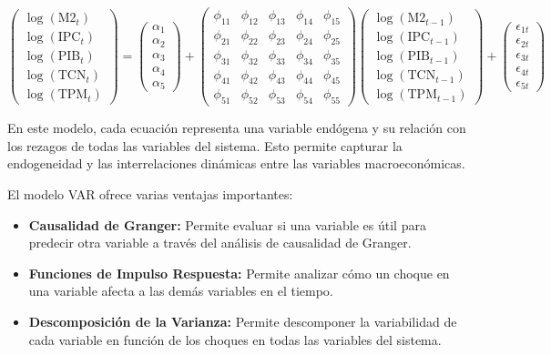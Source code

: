 \documentclass[
  12pt,
]{article}
\providecommand{\tightlist}{%
  \setlength{\itemsep}{0pt}\setlength{\parskip}{0pt}}
\begin{document}
\[
\begin{pmatrix}
\log(\text{M2}_t) \\
\log(\text{IPC}_t) \\
\log(\text{PIB}_t) \\
\log(\text{TCN}_t) \\
\log(\text{TPM}_t)
\end{pmatrix}
=
\begin{pmatrix}
\alpha_{1} \\
\alpha_{2} \\
\alpha_{3} \\
\alpha_{4} \\
\alpha_{5}
\end{pmatrix}
+
\begin{pmatrix}
\phi_{11} & \phi_{12} & \phi_{13} & \phi_{14} & \phi_{15} \\
\phi_{21} & \phi_{22} & \phi_{23} & \phi_{24} & \phi_{25} \\
\phi_{31} & \phi_{32} & \phi_{33} & \phi_{34} & \phi_{35} \\
\phi_{41} & \phi_{42} & \phi_{43} & \phi_{44} & \phi_{45} \\
\phi_{51} & \phi_{52} & \phi_{53} & \phi_{54} & \phi_{55}
\end{pmatrix}
\begin{pmatrix}
\log(\text{M2}_{t-1}) \\
\log(\text{IPC}_{t-1}) \\
\log(\text{PIB}_{t-1}) \\
\log(\text{TCN}_{t-1}) \\
\log(\text{TPM}_{t-1})
\end{pmatrix}
+
\begin{pmatrix}
\epsilon_{1t} \\
\epsilon_{2t} \\
\epsilon_{3t} \\
\epsilon_{4t} \\
\epsilon_{5t}
\end{pmatrix}
\]

En este modelo, cada ecuación representa una variable endógena y su
relación con los rezagos de todas las variables del sistema. Esto
permite capturar la endogeneidad y las interrelaciones dinámicas entre
las variables macroeconómicas.

El modelo VAR ofrece varias ventajas importantes:

\begin{itemize}
\tightlist
\item
  \textbf{Causalidad de Granger:} Permite evaluar si una variable es
  útil para predecir otra variable a través del análisis de causalidad
  de Granger.
\item
  \textbf{Funciones de Impulso Respuesta:} Permite analizar cómo un
  choque en una variable afecta a las demás variables en el tiempo.
\item
  \textbf{Descomposición de la Varianza:} Permite descomponer la
  variabilidad de cada variable en función de los choques en todas las
  variables del sistema.
\end{itemize}
\end{document}

